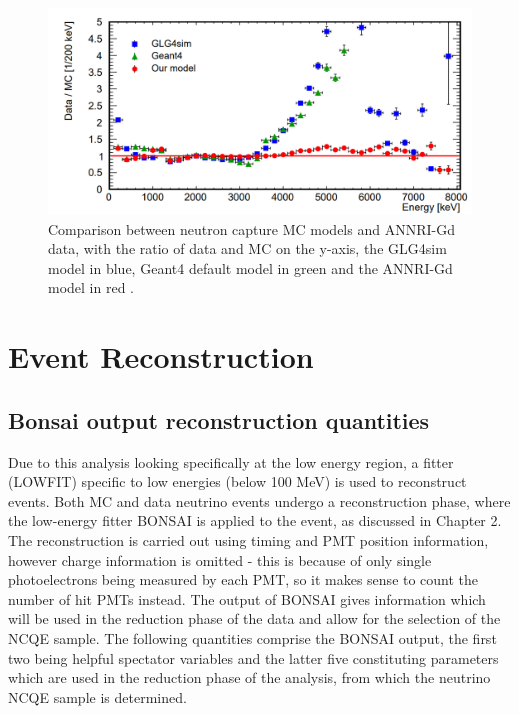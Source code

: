 \begin{figure}[htp]
\includegraphics[width=\textwidth]{Figures/annrigdmodelcompare.png}
\caption{Comparison between neutron capture MC models and ANNRI-Gd data, with the ratio of data and MC on the y-axis, the GLG4sim model in blue, Geant4 default model in green and the ANNRI-Gd model in red \cite{annri_gd_energy}.}
\label{fig:annrigdmodelcompare}
\end{figure}


\section{Event Reconstruction}
\subsection{Bonsai output reconstruction quantities}

Due to this analysis looking specifically at the low energy region, a fitter (LOWFIT) specific to low energies (below 100 MeV) is used to reconstruct events. Both MC and data neutrino events undergo a reconstruction phase, where the low-energy fitter BONSAI is applied to the event, as discussed in Chapter 2. The reconstruction is carried out using timing and PMT position information, however charge information is omitted - this is because of only single photoelectrons being measured by each PMT, so it makes sense to count the number of hit PMTs instead. The output of BONSAI gives information which will be used in the reduction phase of the data and allow for the selection of the NCQE sample. The following quantities comprise the BONSAI output, the first two being helpful spectator variables and the latter five constituting parameters which are used in the reduction phase of the analysis, from which the neutrino NCQE sample is determined.\\


